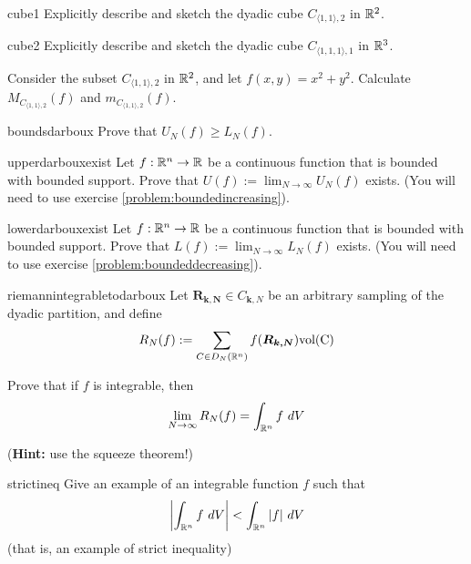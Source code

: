 \begin{problem}{cube1}
    Explicitly describe and sketch the dyadic cube $C_{\langle1,1\rangle,2}$ in $\mathbb{R}^2$.
\end{problem}

\begin{problem}{cube2}
    Explicitly describe and sketch the dyadic cube $C_{\langle1,1,1\rangle,1}$ in $\mathbb{R}^3$.
\end{problem}

\begin{problem}
    Consider the subset $C_{\langle1,1\rangle,2}$ in $\mathbb{R}^2$, and let $f(x,y) = x^2 + y^2$.  Calculate $M_{C_{\langle1,1\rangle,2}}(f)$ and $m_{C_{\langle1,1\rangle,2}}(f)$.
\end{problem}


\begin{problem}{boundsdarboux}
    Prove that $U_N(f) \geq L_N(f)$.
\end{problem}

\begin{problem}{upperdarbouxexist}
    Let $f: \mathbb{R}^n \to \mathbb{R}$ be a continuous function that is bounded with bounded support. Prove that $U(f) := \lim_{N \to \infty} U_N(f)$ exists.  (You will need to use exercise \ref{problem:boundedincreasing}).
    
\end{problem}

\begin{problem}{lowerdarbouxexist}
    Let $f: \mathbb{R}^n \to \mathbb{R}$ be a continuous function that is bounded with bounded support. Prove that $L(f) := \lim_{N \to \infty} L_N(f)$ exists. (You will need to use exercise \ref{problem:boundeddecreasing}).
\end{problem}

\begin{problem}{riemannintegrabletodarboux}
    Let $\bm{R_{k,N}} \in C_{\bm{k},N}$ be an arbitrary sampling of the dyadic partition, and define 
    $$R_N(f) := \sum_{C \in D_N(\mathbb{R}^n)} f(\bm{R_{k,N}}) \textnormal{vol(C)}$$
    
    Prove that if $f$ is integrable, then
    $$\lim_{N\to\infty} R_N(f) = \int_{\mathbb{R}^n}f \ dV $$

    (\textbf{Hint:} use the squeeze theorem!)
\end{problem}


\begin{problem}{strictineq}
    Give an example of an integrable function $f$ such that $$\left|\int_{\mathbb{R}^n} f \ dV\right| < \int_{\mathbb{R}^n} |f| \ dV$$
    (that is, an example of strict inequality)
\end{problem}

